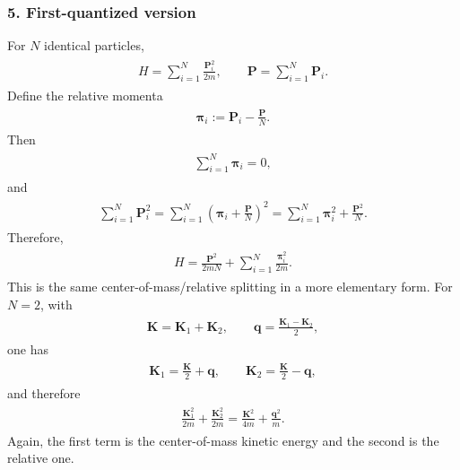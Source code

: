 \documentclass[../QFT_main.tex]{subfiles}
\begin{document}
\subsubsection*{5. First-quantized version}
For $N$ identical particles,
{\small\begin{align}
\begin{aligned}
    H=\sum_{i=1}^N \frac{\mathbf{P}_i^2}{2m},\qquad \mathbf{P}=\sum_{i=1}^N \mathbf{P}_i.
\end{aligned}
\end{align}}
Define the relative momenta
{\small\begin{align}
\begin{aligned}
    \boldsymbol{\pi}_i:=\mathbf{P}_i-\frac{\mathbf{P}}{N}.
\end{aligned}
\end{align}}
Then
{\small\begin{align}
\begin{aligned}
    \sum_{i=1}^N \boldsymbol{\pi}_i=0,
\end{aligned}
\end{align}}
and
{\small\begin{align}
\begin{aligned}
    \sum_{i=1}^N \mathbf{P}_i^2=\sum_{i=1}^N\left(\boldsymbol{\pi}_i+\frac{\mathbf{P}}{N}\right)^2=\sum_{i=1}^N \boldsymbol{\pi}_i^2+\frac{\mathbf{P}^2}{N}.
\end{aligned}
\end{align}}
Therefore,
{\small\begin{align}
\begin{aligned}
    H=\frac{\mathbf{P}^2}{2mN}+\sum_{i=1}^N\frac{\boldsymbol{\pi}_i^2}{2m}.
\end{aligned}
\end{align}}
This is the same center-of-mass/relative splitting in a more elementary form.
For $N=2$, with
{\small\begin{align}
\begin{aligned}
    \mathbf{K}=\mathbf{K}_1+\mathbf{K}_2,\qquad \mathbf{q}=\frac{\mathbf{K}_1-\mathbf{K}_2}{2},
\end{aligned}
\end{align}}
one has
{\small\begin{align}
\begin{aligned}
    \mathbf{K}_1=\frac{\mathbf{K}}{2}+\mathbf{q},\qquad \mathbf{K}_2=\frac{\mathbf{K}}{2}-\mathbf{q},
\end{aligned}
\end{align}}
and therefore
{\small\begin{align}
\begin{aligned}
    \frac{\mathbf{K}_1^2}{2m}+\frac{\mathbf{K}_2^2}{2m}=\frac{\mathbf{K}^2}{4m}+\frac{\mathbf{q}^2}{m}.
\end{aligned}
\end{align}}
Again, the first term is the center-of-mass kinetic energy and the second is the relative one.
\end{document}
